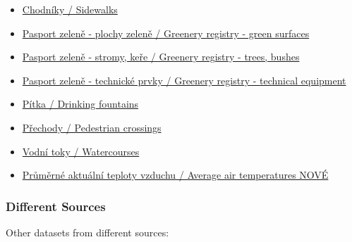\documentclass[11pt,a4paper]{article}
\providecommand{\tightlist}{\setlength{\itemsep}{0pt}\setlength{\parskip}{0pt}}
\begin{document}
\begin{itemize}
  \tightlist
  \item \href{https://data.brno.cz/datasets/mestobrno::chodn\%C3\%ADky-sidewalks/about}{Chodníky / Sidewalks}

  \item \href{https://data.brno.cz/datasets/mestobrno::pasport-zelen\%C4\%9B-plochy-zelen\%C4\%9B-greenery-registry-green-surfaces/about}{Pasport zeleně - plochy zeleně / Greenery registry - green surfaces}
  
  \item \href{https://data.brno.cz/datasets/mestobrno::pasport-zelen\%C4\%9B-stromy-ke\%C5\%99e-greenery-registry-trees-bushes/about}{Pasport zeleně - stromy, keře / Greenery registry - trees, bushes}

  \item \href{https://data.brno.cz/datasets/mestobrno::pasport-zelen\%C4\%9B-technick\%C3\%A9-prvky-greenery-registry-technical-equipment/about}{Pasport zeleně - technické prvky / Greenery registry - technical equipment}

  \item \href{https://data.brno.cz/datasets/mestobrno::p\%C3\%ADtka-drinking-fountains/about}{Pítka / Drinking fountains}

  \item \href{https://data.brno.cz/datasets/mestobrno::p\%C5\%99echody-pedestrian-crossings/about}{Přechody / Pedestrian crossings}

  \item \href{https://data.brno.cz/datasets/mestobrno::vodn\%C3\%AD-toky-watercourses/about}{Vodní toky / Watercourses}

  \item \href{https://datahub.brno.cz/datasets/mestobrno::pr\%C5\%AFm\%C4\%9Brn\%C3\%A9-aktu\%C3\%A1ln\%C3\%AD-teploty-vzduchu-average-air-temperaturatures-nov\%C3\%A9/about}{Průměrné aktuální teploty vzduchu / Average air temperatures NOVÉ}

\end{itemize}

\subsubsection{Different Sources}

Other datasets from different sources:
\end{document}
